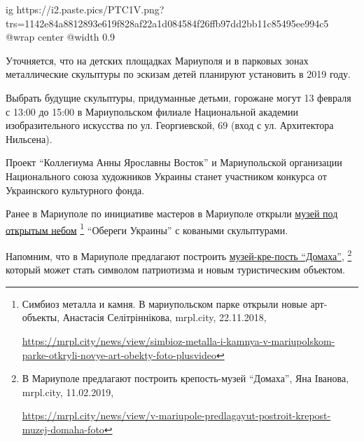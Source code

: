 \ifcmt
  ig https://i2.paste.pics/PTC1V.png?trs=1142e84a8812893e619f828af22a1d084584f26ffb97dd2bb11c85495ee994c5
  @wrap center
  @width 0.9
\fi

Уточняется, что на детских площадках Мариуполя и в парковых зонах металлические
скульптуры по эскизам детей планируют установить в 2019 году.

Выбрать будущие скульптуры, придуманные детьми, горожане могут 13 февраля с
13:00 до 15:00 в Мариупольском филиале Национальной академии изобразительного
искусства по ул. Георгиевской, 69 (вход с ул. Архитектора Нильсена).

Проект \enquote{Коллегиума Анны Ярославны Восток} и Мариупольской организации
Национального союза художников Украины станет участником конкурса от
Украинского культурного фонда.

Ранее в Мариуполе по инициативе мастеров в Мариуполе открыли \href{https://mrpl.city/news/view/simbioz-metalla-i-kamnya-v-mariupolskom-parke-otkryli-novye-art-obekty-foto-plusvideo}{музей под открытым
небом}%
\footnote{Симбиоз металла и камня. В мариупольском парке открыли новые арт-объекты, Анастасія Селітріннікова, mrpl.city, 22.11.2018, \par\url{https://mrpl.city/news/view/simbioz-metalla-i-kamnya-v-mariupolskom-parke-otkryli-novye-art-obekty-foto-plusvideo}}
\enquote{Обереги Украины} с коваными скульптурами.

Напомним, что в Мариуполе предлагают построить \href{https://mrpl.city/news/view/v-mariupole-predlagayut-postroit-krepost-muzej-domaha-foto}{музей-кре\hyp{}пость \enquote{Домаха}},%
\footnote{В Мариуполе предлагают построить крепость-музей \enquote{Домаха}, Яна Іванова, mrpl.city, 11.02.2019, \par\url{https://mrpl.city/news/view/v-mariupole-predlagayut-postroit-krepost-muzej-domaha-foto}}
который может стать символом патриотизма и новым туристическим объектом.

